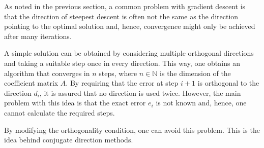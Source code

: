     As noted in the previous section, a common problem with gradient descent is that the direction of steepest descent is often not the same as the direction pointing to the optimal solution and, hence, convergence might only be achieved after many iterations.

    A simple solution can be obtained by considering multiple orthogonal directions and taking a suitable step once in every direction. This way, one obtains an algorithm that converges in $n$ steps, where $n\in\mathbb{N}$ is the dimension of the coefficient matrix $A$. By requiring that the error at step $i+1$ is orthogonal to the direction $d_i$, it is assured that no direction is used twice. However, the main problem with this idea is that the exact error $e_i$ is not known and, hence, one cannot calculate the required steps.

    By modifying the orthogonality condition, one can avoid this problem. This is the idea behind conjugate direction methods.

